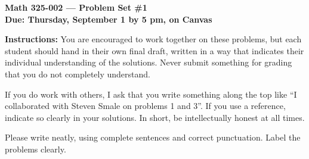 \documentclass{amsart}
\begin{document}
\begin{center}
{\large\bfseries
Math 325-002 --- Problem Set \#1 \\
Due: Thursday, September 1 by 5 pm, on Canvas}
\end{center}





{\bf Instructions:} You are encouraged to work together on these
problems, but each student should hand in their own final draft,
written in a way that indicates their individual understanding of
the solutions. Never submit something for grading
that you do not completely understand. 

If you do work with others, I ask that you write something along the
top like ``I collaborated with Steven Smale on problems 1 and 3''.
If you use a reference, indicate so clearly in your solutions. 
In short, be intellectually
honest at all times.

Please write neatly, using complete sentences and correct
punctuation. Label the problems clearly. 
\end{document}
